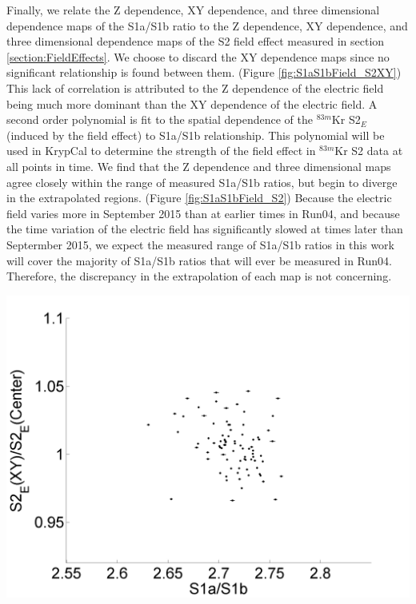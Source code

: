 \documentclass[a4paper,12pt]{article}
\begin{document}
{Finally, we relate the Z dependence, XY dependence, and three dimensional dependence maps of the S1a/S1b ratio to the Z dependence, XY dependence, and three dimensional dependence maps of the S2 field effect measured in section \ref{section:FieldEffects}.  We choose to discard the XY dependence maps since no significant relationship is found between them. (Figure \ref{fig:S1aS1bField_S2XY}) This lack of correlation is attributed to the Z dependence of the electric field being much more dominant than the XY dependence of the electric field.  A second order polynomial is fit to the spatial dependence of the $^{83m}$Kr S2$_E$ (induced by the field effect) to S1a/S1b relationship.  This polynomial will be used in KrypCal to determine the strength of the field effect in $^{83m}$Kr S2 data at all points in time.  We find that the Z dependence and three dimensional maps agree closely within the range of measured S1a/S1b ratios, but begin to diverge in the extrapolated regions. (Figure \ref{fig:S1aS1bField_S2})  Because the electric field varies more in September 2015 than at earlier times in Run04, and because the time variation of the electric field has significantly slowed at times later than Septermber 2015, we expect the measured range of S1a/S1b ratios in this work will cover the majority of S1a/S1b ratios that will ever be measured in Run04. Therefore, the discrepancy in the extrapolation of each map is not concerning. 

\begin{center}
\includegraphics[scale=0.6]{Run04Corrections/S1aS1bVField_XYDep.png}
 \label{fig:S1aS1bField_S2XY}
\end{center}

}
\end{document}
